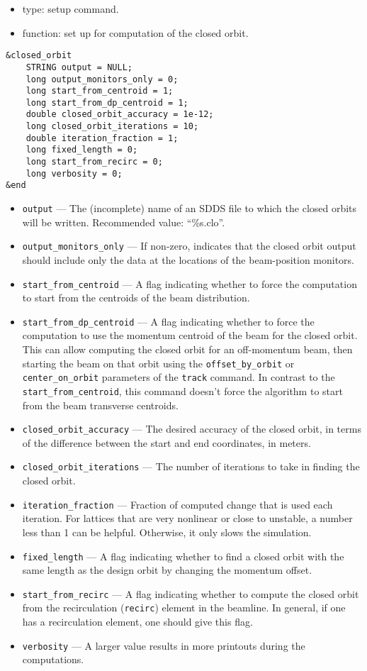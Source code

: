 \documentclass[11pt]{article}
\begin{document}
\begin{itemize}
\item type: setup command.
\item function: set up for computation of the closed orbit.
\end{itemize}

\begin{verbatim}
&closed_orbit
    STRING output = NULL;
    long output_monitors_only = 0;
    long start_from_centroid = 1;
    long start_from_dp_centroid = 1;
    double closed_orbit_accuracy = 1e-12;
    long closed_orbit_iterations = 10;
    double iteration_fraction = 1;
    long fixed_length = 0;
    long start_from_recirc = 0;
    long verbosity = 0;
&end
\end{verbatim}

\begin{itemize}
\item \verb|output| --- The (incomplete) name of an SDDS file to which
the closed orbits will be written.  Recommended value: ``\%s.clo''.
\item \verb|output_monitors_only| --- If non-zero, indicates that the
closed orbit output should include only the data at the locations of
the beam-position monitors.
\item \verb|start_from_centroid| --- A flag indicating whether to
force the computation to start from the centroids of the beam
distribution.
\item \verb|start_from_dp_centroid| --- A flag indicating whether to 
force the computation to use the momentum centroid of the beam 
for the closed orbit.  This can allow computing the closed orbit
for an off-momentum beam, then starting the beam on that orbit
using the \verb|offset_by_orbit| or \verb|center_on_orbit| parameters
of the \verb|track| command.  In contrast to the \verb|start_from_centroid|,
this command doesn't force the algorithm to start from the beam
transverse centroids.
\item \verb|closed_orbit_accuracy| --- The desired accuracy of the
closed orbit, in terms of the difference between the start and end
coordinates, in meters.
\item \verb|closed_orbit_iterations| --- The number of iterations to
take in finding the closed orbit.
\item \verb|iteration_fraction| --- Fraction of computed change that
is used each iteration.  For lattices that are very nonlinear or close
to unstable, a number less than 1 can be helpful.  Otherwise, it only
slows the simulation.
\item \verb|fixed_length| --- A flag indicating whether to find a
closed orbit with the same length as the design orbit by changing the
momentum offset.
\item \verb|start_from_recirc| --- A flag indicating whether to
compute the closed orbit from the recirculation (\verb|recirc|)
element in the beamline.  In general, if one has a recirculation
element, one should give this flag.
\item \verb|verbosity| --- A larger value results in more printouts
during the computations.
\end{itemize}
\end{document}
